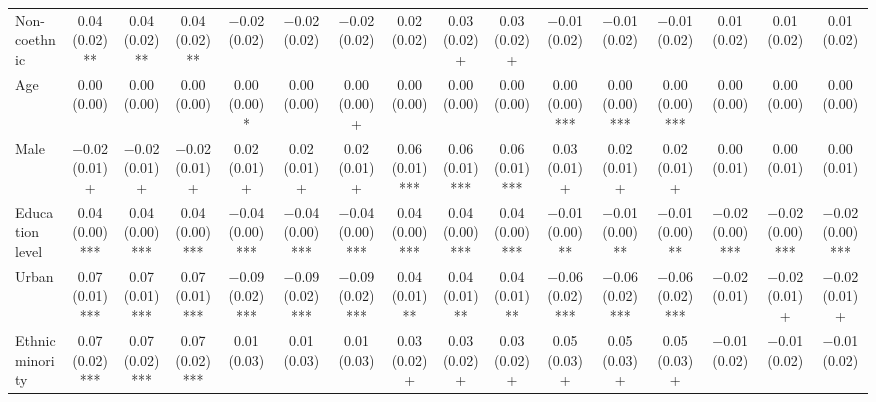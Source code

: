 \begin{table}[H]
\begin{tabular}[t]{lccccccccccccccc}
Non-coethnic & \num{0.04} (\num{0.02})** & \num{0.04} (\num{0.02})** & \num{0.04} (\num{0.02})** & \num{-0.02} (\num{0.02}) & \num{-0.02} (\num{0.02}) & \num{-0.02} (\num{0.02}) & \num{0.02} (\num{0.02}) & \num{0.03} (\num{0.02})+ & \num{0.03} (\num{0.02})+ & \num{-0.01} (\num{0.02}) & \num{-0.01} (\num{0.02}) & \num{-0.01} (\num{0.02}) & \num{0.01} (\num{0.02}) & \num{0.01} (\num{0.02}) & \num{0.01} (\num{0.02})\\
Age & \num{0.00} (\num{0.00}) & \num{0.00} (\num{0.00}) & \num{0.00} (\num{0.00}) & \num{0.00} (\num{0.00})* & \num{0.00} (\num{0.00}) & \num{0.00} (\num{0.00})+ & \num{0.00} (\num{0.00}) & \num{0.00} (\num{0.00}) & \num{0.00} (\num{0.00}) & \num{0.00} (\num{0.00})*** & \num{0.00} (\num{0.00})*** & \num{0.00} (\num{0.00})*** & \num{0.00} (\num{0.00}) & \num{0.00} (\num{0.00}) & \num{0.00} (\num{0.00})\\
Male & \num{-0.02} (\num{0.01})+ & \num{-0.02} (\num{0.01})+ & \num{-0.02} (\num{0.01})+ & \num{0.02} (\num{0.01})+ & \num{0.02} (\num{0.01})+ & \num{0.02} (\num{0.01})+ & \num{0.06} (\num{0.01})*** & \num{0.06} (\num{0.01})*** & \num{0.06} (\num{0.01})*** & \num{0.03} (\num{0.01})+ & \num{0.02} (\num{0.01})+ & \num{0.02} (\num{0.01})+ & \num{0.00} (\num{0.01}) & \num{0.00} (\num{0.01}) & \num{0.00} (\num{0.01})\\
Education level & \num{0.04} (\num{0.00})*** & \num{0.04} (\num{0.00})*** & \num{0.04} (\num{0.00})*** & \num{-0.04} (\num{0.00})*** & \num{-0.04} (\num{0.00})*** & \num{-0.04} (\num{0.00})*** & \num{0.04} (\num{0.00})*** & \num{0.04} (\num{0.00})*** & \num{0.04} (\num{0.00})*** & \num{-0.01} (\num{0.00})** & \num{-0.01} (\num{0.00})** & \num{-0.01} (\num{0.00})** & \num{-0.02} (\num{0.00})*** & \num{-0.02} (\num{0.00})*** & \num{-0.02} (\num{0.00})***\\
Urban & \num{0.07} (\num{0.01})*** & \num{0.07} (\num{0.01})*** & \num{0.07} (\num{0.01})*** & \num{-0.09} (\num{0.02})*** & \num{-0.09} (\num{0.02})*** & \num{-0.09} (\num{0.02})*** & \num{0.04} (\num{0.01})** & \num{0.04} (\num{0.01})** & \num{0.04} (\num{0.01})** & \num{-0.06} (\num{0.02})*** & \num{-0.06} (\num{0.02})*** & \num{-0.06} (\num{0.02})*** & \num{-0.02} (\num{0.01}) & \num{-0.02} (\num{0.01})+ & \num{-0.02} (\num{0.01})+\\
Ethnic minority & \num{0.07} (\num{0.02})*** & \num{0.07} (\num{0.02})*** & \num{0.07} (\num{0.02})*** & \num{0.01} (\num{0.03}) & \num{0.01} (\num{0.03}) & \num{0.01} (\num{0.03}) & \num{0.03} (\num{0.02})+ & \num{0.03} (\num{0.02})+ & \num{0.03} (\num{0.02})+ & \num{0.05} (\num{0.03})+ & \num{0.05} (\num{0.03})+ & \num{0.05} (\num{0.03})+ & \num{-0.01} (\num{0.02}) & \num{-0.01} (\num{0.02}) & \num{-0.01} (\num{0.02})\\

\end{tabular}
\end{table}

